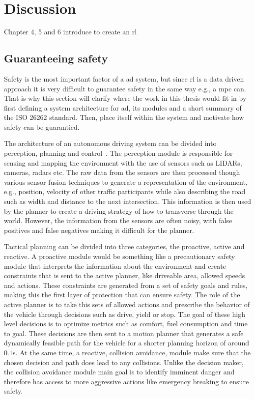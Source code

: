 \chapter{Discussion}
\label{sec:discussion}
Chapter 4, 5 and 6 introduce to create an \gls{rl}

\section{Guaranteeing safety}
\label{sec:system_architecture}
Safety is the most important factor of a \gls{ad} system, but since \gls{rl} is a data driven approach it is very difficult to guarantee safety \cite{tbd} in the same way e.g., a \gls{mpc} can. That is why this section will clarify where the work in this thesis would fit in by first defining a system architecture for \gls{ad}, its modules and a short summary of the ISO 26262 standard. Then, place itself within the system and motivate how safety can be guarantied. 

The architecture of an autonomous driving system can be divided into perception, planning and control~\cite{Schwarting2018,Kortenkamp2008}.
The perception module is responsible for sensing and mapping the environment with the use of sensors such as LIDARs, cameras, radars etc. The raw data from the sensors are then processed though various sensor fusion techniques to generate a representation of the environment, e.g., position, velocity of other traffic participants while also describing the road such as width and distance to the next intersection. This information is then used by the planner to create a driving strategy of how to transverse through the world. However, the information from the sensors are often noisy, with false positives and false negatives making it difficult for the planner.

Tactical planning can be divided into three categories, the proactive, active and reactive. A proactive module would be something like a precautionary safety module that interprets the information about the environment and create constraints that is sent to the active planner, like  driveable area, allowed speeds and actions. These constraints are generated from a set of safety goals and rules, making this the first layer of protection that can ensure safety. 
The role of the active planner is to take this sets of allowed actions and prescribe the behavior of the vehicle through decisions such as drive, yield or stop. The goal of these high level decisions is to optimize metrics such as comfort, fuel consumption and time to goal. These decisions are then sent to a motion planner that generates a safe dynamically feasible path for the vehicle for a shorter planning horizon of around $0.1$s. 
At the same time, a reactive, collision avoidance, module make sure that the chosen decision and path does lead to any collisions. Unlike the decision maker, the collision avoidance module main goal is to identify imminent danger and therefore has access to more aggressive actions like emergency breaking to ensure safety. 
 
